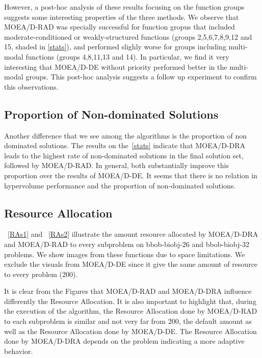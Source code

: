 However, a post-hoc analysis of these results focusing on the function groups
suggests some interesting properties of the three methods. We observe that
MOEA/D-RAD was specially successful for function gropus that included
moderate-conditioned or weakly-structured functions (groups 2,5,6,7,8,9,12 and
15, shaded in \ref{stats}), and performed slighly worse for groups including
multi-modal functions (groups 4,8,11,13 and 14). In particular, we find it  very
interesting that MOEA/D-DE without priority performed better in the multi-modal
groups. This post-hoc analysis suggests a follow up experiment to confirm this
observations.

\subsection{Proportion of Non-dominated Solutions}
%
%
%
Another difference that we see among the algorithms  is the proportion of non dominated solutions. The results on the~\ref{stats} indicate that MOEA/D-DRA leads to the highest rate of non-dominated solutions in the final solution set, followed by MOEA/D-RAD. In general, both substantially improve this proportion over the results of MOEA/D-DE.  It seems that there is no relation in hypervolume performance and the proportion of non-dominated solutions.


\subsection{Resource Allocation}


~\ref{RAs1} and ~\ref{RAs2} illustrate the amount resource allocated by MOEA/D-DRA and MOEA/D-RAD to every subproblem on bbob-biobj-26 and bbob-biobj-32 problems. We show images from these functions due to space limitations. We exclude the visuals from MOEA/D-DE since it give the same amount of resource to every problem (200).

It is clear from the Figures that MOEA/D-RAD and MOEA/D-DRA influence differently the Resource Allocation. It is also important to highlight that, during the execution of the algorithm, the Resource Allocation done by MOEA/D-RAD to each subproblem is similar and not very far from 200, the default amount as well as the Resource Allocation done by MOEA/D-DE. The Resource Allocation done by MOEA/D-DRA depends on the problem indicating a more adaptive behavior.
